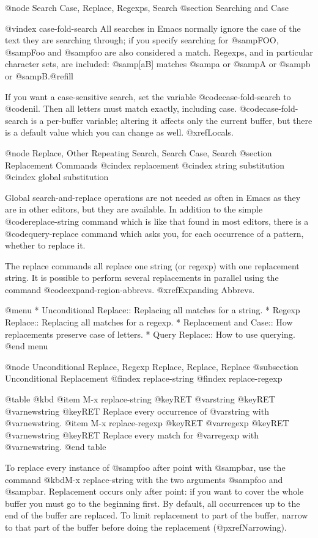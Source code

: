 {{{{{{{{{{{{{{@node Search Case, Replace, Regexps, Search
@section Searching and Case

@vindex case-fold-search
  All searches in Emacs normally ignore the case of the text they
are searching through; if you specify searching for @samp{FOO},
@samp{Foo} and @samp{foo} are also considered a match.  Regexps, and in
particular character sets, are included: @samp{[aB]} matches @samp{a}
or @samp{A} or @samp{b} or @samp{B}.@refill

  If you want a case-sensitive search, set the variable
@code{case-fold-search} to @code{nil}.  Then all letters must match
exactly, including case. @code{case-fold-search} is a per-buffer
variable; altering it affects only the current buffer, but
there is a default value which you can change as well.  @xref{Locals}.

@node Replace, Other Repeating Search, Search Case, Search
@section Replacement Commands
@cindex replacement
@cindex string substitution
@cindex global substitution

  Global search-and-replace operations are not needed as often in Emacs as
they are in other editors, but they are available.  In addition to the
simple @code{replace-string} command which is like that found in most
editors, there is a @code{query-replace} command which asks you, for each
occurrence of a pattern, whether to replace it.

  The replace commands all replace one string (or regexp) with one
replacement string.  It is possible to perform several replacements in
parallel using the command @code{expand-region-abbrevs}.  @xref{Expanding
Abbrevs}.

@menu
* Unconditional Replace::  Replacing all matches for a string.
* Regexp Replace::         Replacing all matches for a regexp.
* Replacement and Case::   How replacements preserve case of letters.
* Query Replace::          How to use querying.
@end menu

@node Unconditional Replace, Regexp Replace, Replace, Replace
@subsection Unconditional Replacement
@findex replace-string
@findex replace-regexp

@table @kbd
@item M-x replace-string @key{RET} @var{string} @key{RET} @var{newstring} @key{RET}
Replace every occurrence of @var{string} with @var{newstring}.
@item M-x replace-regexp @key{RET} @var{regexp} @key{RET} @var{newstring} @key{RET}
Replace every match for @var{regexp} with @var{newstring}.
@end table

  To replace every instance of @samp{foo} after point with @samp{bar},
use the command @kbd{M-x replace-string} with the two arguments
@samp{foo} and @samp{bar}.  Replacement occurs only after point: if you
want to cover the whole buffer you must go to the beginning first.  By
default, all occurrences up to the end of the buffer are replaced.  To
limit replacement to part of the buffer, narrow to that part of the
buffer before doing the replacement (@pxref{Narrowing}).

}}}}}}}}}}}}}}

